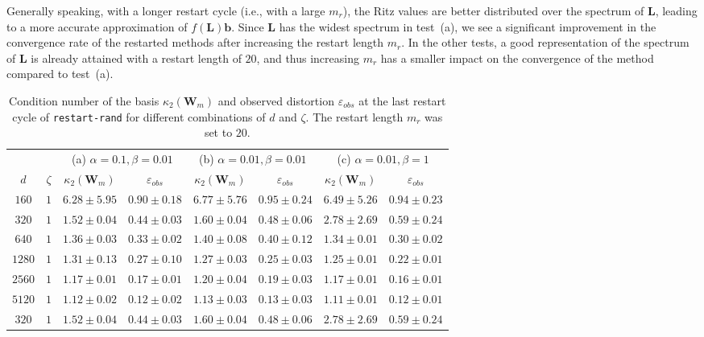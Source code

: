 \documentclass[smallextended]{svjour3}
\renewcommand{\vec}[1]{\mathbf{#1}}
\newcommand{\mat}[1]{\mathbf{#1}}
\begin{document}
Generally speaking, with a longer restart cycle (i.e., with a large $m_r$), the Ritz values are better distributed over the spectrum of $\mat{L}$, leading to a more accurate approximation of $f(\mat{L}) \vec{b}$. Since $\mat{L}$ has the widest spectrum in test~(a), we see a significant improvement in the convergence rate of the restarted methods after increasing the restart length $m_r$. In the other tests, a good representation of the spectrum of $\mat{L}$ is already attained with a restart length of $20$, and thus increasing $m_r$ has a smaller impact on the convergence of the method compared to test~(a).

\begin{table}[t]
\centering
\caption{Condition number of the basis $\kappa_2(\mat{W}_m)$ and observed distortion $\varepsilon_{obs}$ at the last restart cycle of \texttt{restart-rand} for different combinations of $d$ and $\zeta$. The restart length $m_r$ was set to $20$.}
\label{tab:conv_diff_restart}
\begin{tabular}{cccccccc}
\hline
 &  & \multicolumn{2}{c}{(a) $\alpha = 0.1, \beta = 0.01$} & \multicolumn{2}{c}{(b) $\alpha = 0.01, \beta = 0.01$} & \multicolumn{2}{c}{(c) $\alpha = 0.01, \beta = 1$} \\
\cline{3-4}\cline{5-6}\cline{7-8}
$d$ & $\zeta$ & $\kappa_2(\mat{W}_m)$ & $\varepsilon_{obs}$ & $\kappa_2(\mat{W}_m)$ & $\varepsilon_{obs}$ & $\kappa_2(\mat{W}_m)$ & $\varepsilon_{obs}$ \\
\hline
$160$ & $1$ & $6.28 \pm 5.95$ & $0.90 \pm 0.18$ & $6.77 \pm 5.76$ & $0.95 \pm 0.24$ & $6.49 \pm 5.26$ & $0.94 \pm 0.23$ \\
$320$ & $1$ & $1.52 \pm 0.04$ & $0.44 \pm 0.03$ & $1.60 \pm 0.04$ & $0.48 \pm 0.06$ & $2.78 \pm 2.69$ & $0.59 \pm 0.24$ \\
$640$ & $1$ & $1.36 \pm 0.03$ & $0.33 \pm 0.02$ & $1.40 \pm 0.08$ & $0.40 \pm 0.12$ & $1.34 \pm 0.01$ & $0.30 \pm 0.02$ \\
$1280$ & $1$ & $1.31 \pm 0.13$ & $0.27 \pm 0.10$ & $1.27 \pm 0.03$ & $0.25 \pm 0.03$ & $1.25 \pm 0.01$ & $0.22 \pm 0.01$ \\
$2560$ & $1$ & $1.17 \pm 0.01$ & $0.17 \pm 0.01$ & $1.20 \pm 0.04$ & $0.19 \pm 0.03$ & $1.17 \pm 0.01$ & $0.16 \pm 0.01$ \\
$5120$ & $1$ & $1.12 \pm 0.02$ & $0.12 \pm 0.02$ & $1.13 \pm 0.03$ & $0.13 \pm 0.03$ & $1.11 \pm 0.01$ & $0.12 \pm 0.01$ \\
\hline
$320$ & $1$ & $1.52 \pm 0.04$ & $0.44 \pm 0.03$ & $1.60 \pm 0.04$ & $0.48 \pm 0.06$ & $2.78 \pm 2.69$ & $0.59 \pm 0.24$ \\

\end{tabular}
\end{table}
\end{document}
